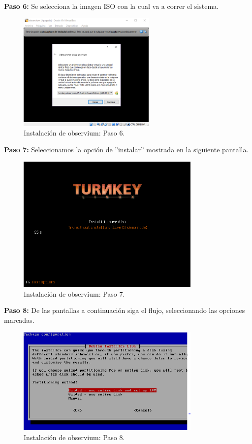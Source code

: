 \noindent
\textbf{Paso 6:} Se selecciona la imagen ISO con la cual va a correr el sistema.

\pagebreak
\begin{figure}[htbp!]
	\centering
		\includegraphics[width=0.6\textwidth]{images/desarrollo/instalarObservium_paso6.png}
	\caption{Instalación de observium: Paso 6.}
\end{figure}

\noindent
\textbf{Paso 7:} Seleccionamos la opción de ''instalar'' mostrada en la siguiente pantalla. 

\begin{figure}[htbp!]
	\centering
		\includegraphics[width=0.8\textwidth]{images/desarrollo/instalarObservium_paso7.png}
	\caption{Instalación de observium: Paso 7.}
\end{figure}

\noindent
\textbf{Paso 8:} De las pantallas a continuación siga el flujo, seleccionando las opciones marcadas. 

\pagebreak
\begin{figure}[htbp!]
	\centering
		\includegraphics[width=0.8\textwidth]{images/desarrollo/instalarObservium_paso8.png}
	\caption{Instalación de observium: Paso 8.}
\end{figure}

